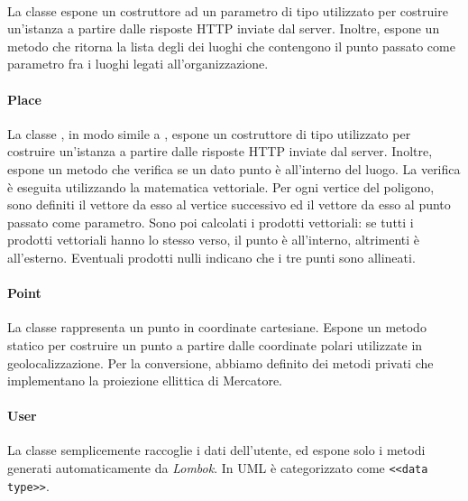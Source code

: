 \documentclass[../../manuale-manutentore.tex]{subfiles}
\begin{document}
\paragraph[Organization]{}%
\label{par:app/organization}

La classe  espone un costruttore ad un parametro di tipo  utilizzato per costruire un'istanza a partire dalle risposte HTTP inviate dal server.
Inoltre, espone un metodo  che ritorna la lista degli  dei luoghi che contengono il punto passato come parametro fra i luoghi legati all'organizzazione.

\paragraph[Place]{Place}%
\label{par:place}

La classe , in modo simile a , espone un costruttore di tipo  utilizzato per costruire un'istanza a partire dalle risposte HTTP inviate dal server.
Inoltre, espone un metodo  che verifica se un dato punto è all'interno del luogo.
La verifica è eseguita utilizzando la matematica vettoriale.
Per ogni vertice del poligono, sono definiti il vettore da esso al vertice successivo ed il vettore da esso al punto passato come parametro.
Sono poi calcolati i prodotti vettoriali: se tutti i prodotti vettoriali hanno lo stesso verso, il punto è all'interno, altrimenti è all'esterno.
Eventuali prodotti nulli indicano che i tre punti sono allineati.

\paragraph[Point]{Point}%
\label{par:point}

La classe  rappresenta un punto in coordinate cartesiane.
Espone un metodo statico \linebreak{} per costruire un punto a partire dalle coordinate polari utilizzate in geolocalizzazione.
Per la conversione, abbiamo definito dei metodi privati che implementano la proiezione ellittica di Mercatore.

\paragraph[User]{User}%
\label{par:app/user}

La classe  semplicemente raccoglie i dati dell'utente, ed espone solo i metodi generati automaticamente da \textit{Lombok}.
In UML è categorizzato come \texttt{<<data type>>}.
\end{document}
